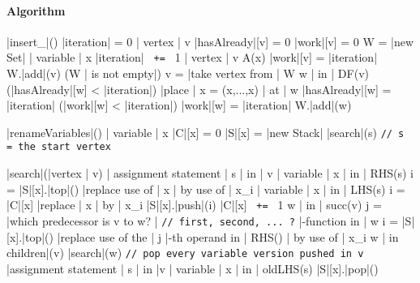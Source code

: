 \documentclass[a4paper,12pt, notitlepage]{article}
\newcommand{\negv}{\vspace{-0.7cm}}
\begin{document}
\paragraph*{Algorithm}
\begin{program}
\PROC |insert_|\phi() \BODY
    |iteration| = 0
    \FOREACH | vertex | v \DO
        |hasAlready|[v] = 0
        |work|[v] = 0
    \OD
    W = |new Set|
    \FOREACH | variable | x \DO
        |iteration| \texttt{ += } 1
        \FOREACH | vertex | v \in A(x) \DO
            |work|[v] = |iteration|
            W.|add|(v)
        \OD
        \WHILE (W | is not empty|) \DO 
            v = |take vertex from | W
            \FOREACH w | in | DF(v) \DO
                \IF (|hasAlready|[w] < |iteration|) \AR*
                    |place | x = \phi(x,...,x) | at | w
                    |hasAlready|[w] = |iteration|
                    \IF (|work|[w] < |iteration|) \AR*
                        |work|[w] = |iteration|
                        W.|add|(w)
                    \FI
                \FI
            \OD
        \OD
    \OD
\end{program}
\negv
\begin{program}
\PROC |renameVariables|() \BODY
    \FOREACH | variable | x \DO
        |C|[x] = 0
        |S|[x] = |new Stack|
    \OD
    |search|(s) \hspace{1cm} \texttt{// s = the start vertex}
\end{program}
\pagebreak
\begin{program}
\PROC |search|(|vertex | v) \BODY
    \FOREACH | assignment statement | s | in | v \DO
        \FOREACH | variable | x | in | RHS(s) \DO
            i = |S|[x].|top|()
            |replace use of | x | by use of | x_i
        \OD
        \FOREACH | variable | x | in | LHS(s) \DO
            i = |C|[x]
            |replace | x | by | x_i
            |S|[x].|push|(i)
            |C|[x] \texttt{ += } 1
        \OD
    \OD
    \FOREACH w | in | succ(v) \DO
        j = |which predecessor is v to w? | \hspace{1cm} \texttt{// first, second, ... ?}
        \FOREACH \phi|-function in | w \DO
            i = |S|[x].|top|()
            |replace use of the | j |-th operand in | RHS(\phi) | by use of | x_i
        \OD
    \OD
    \FOREACH w | in children|(v) \DO
        |search|(w)
    \texttt{// pop every variable version pushed in v}
    \FOREACH |assignment statement | s | in |v \DO
        \FOREACH | variable | x | in | oldLHS(s) \DO
            |S|[x].|pop|()
        \OD
    \OD
\end{program}
\end{document}
